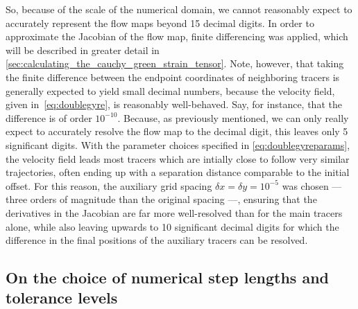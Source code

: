So, because of the scale of the numerical domain, we cannot reasonably expect
to accurately represent the flow maps beyond 15 decimal digits. In order to
approximate the Jacobian of the flow map, finite differencing was applied,
which will be described in greater detail in
\cref{sec:calculating_the_cauchy_green_strain_tensor}. Note, however, that
taking the finite difference between the endpoint coordinates of neighboring
tracers is generally expected to yield small decimal numbers, because the
velocity field, given in~\cref{eq:doublegyre}, is reasonably
well-behaved. Say, for instance, that the difference is of order $10^{-10}$.
Because, as previously mentioned, we can only really expect to accurately
resolve the flow map to the  decimal digit, this leaves only 5
significant digits. With the parameter choices specified in
\cref{eq:doublegyreparams}, the velocity field leads most tracers which
are intially close to follow very similar trajectories, often ending up
with a separation distance comparable to the initial offset. For this reason,
the auxiliary grid spacing $\delta{x}=\delta{y}=10^{-5}$ was chosen --- three
orders of magnitude than the original spacing ---, ensuring that the derivatives
in the Jacobian are far more well-resolved than for the main tracers alone,
while also leaving upwards to 10 significant decimal digits for which the
difference in the final positions of the auxiliary tracers can be resolved.
\clearpage
%
\subsection{On the choice of numerical step lengths and tolerance levels}
\label{sub:on_the_choice_of_numerical_step_lengths_and_tolerance_levels}

